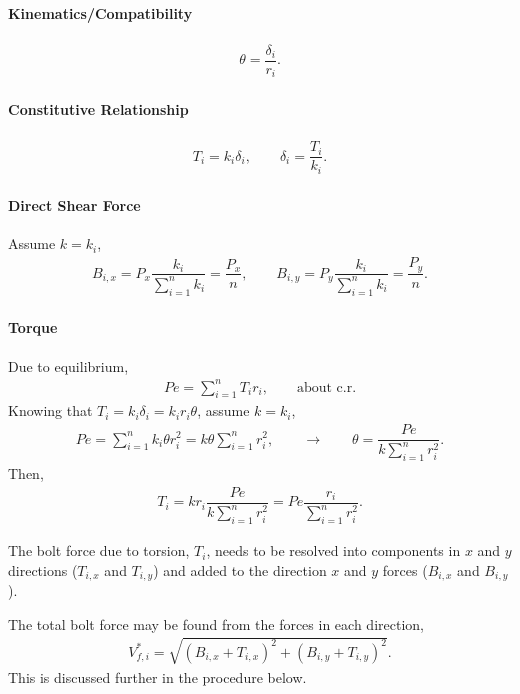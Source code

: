 \paragraph{Kinematics/Compatibility}
\begin{gather}
\theta=\dfrac{\delta_{i}}{r_i}.
\end{gather}
\paragraph{Constitutive Relationship}
\begin{gather}
T_i=k_i\delta_i,\qquad\delta_i=\dfrac{T_i}{k_i}.
\end{gather}
\paragraph{Direct Shear Force}
Assume $k=k_i$,
\begin{gather}
B_{i,x}=P_x\dfrac{k_i}{\sum_{i=1}^nk_i}=\dfrac{P_x}{n},\qquad
B_{i,y}=P_y\dfrac{k_i}{\sum_{i=1}^nk_i}=\dfrac{P_y}{n}.
\end{gather}
\paragraph{Torque}
Due to equilibrium,
\begin{gather}
Pe=\sum_{i=1}^nT_ir_i,\qquad\text{about c.r.}
\end{gather}
Knowing that $T_i=k_i\delta_i=k_ir_i\theta$, assume $k=k_i$,
\begin{gather}
Pe=\sum_{i=1}^nk_i\theta{}r_i^2=k\theta\sum_{i=1}^nr_i^2,\qquad\longrightarrow\qquad
\theta=\dfrac{Pe}{k\sum_{i=1}^nr_i^2}.
\end{gather}
Then,
\begin{gather}
T_i=kr_i\dfrac{Pe}{k\sum_{i=1}^nr_i^2}=Pe\dfrac{r_i}{\sum_{i=1}^nr_i^2}.
\end{gather}

The bolt force due to torsion, $T_i$, needs to be resolved into components in $x$ and $y$ directions ($T_{i,x}$ and $T_{i,y}$) and added to the direction $x$ and $y$ forces ($B_{i,x}$ and $B_{i,y}$).
\begin{figure}[H]
\centering
\end{figure}
The total bolt force may be found from the forces in each direction,
\begin{gather}
V_{f,i}^*=\sqrt{\left(B_{i,x}+T_{i,x}\right)^2+\left(B_{i,y}+T_{i,y}\right)^2}.
\end{gather}
This is discussed further in the procedure below.
